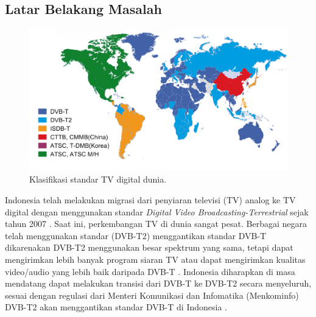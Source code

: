  \chapter{\babSatu}
\section{Latar Belakang Masalah}
\begin{figure}[b!]
	\centering
	\includegraphics[width=1\textwidth]
		{pics/standar.png}
		\caption{Klasifikasi standar TV digital dunia.}
	\label{fig:Klasifikasi Standar TV Digital Dunia}
\end{figure}
Indonesia telah melakukan migrasi dari penyiaran televisi (TV) analog ke TV digital dengan menggunakan standar \textit{Digital Video Broadcasting-Terrestrial}  sejak tahun 2007 \cite{regul2}. Saat ini, perkembangan TV  di dunia sangat pesat. Berbagai negara telah menggunakan standar  (DVB-T2) menggantikan standar DVB-T dikarenakan DVB-T2 menggunakan besar spektrum yang sama, tetapi dapat mengirimkan lebih banyak program siaran TV atau dapat mengirimkan kualitas video/audio yang lebih baik daripada DVB-T \cite{itu}. Indonesia diharapkan di masa mendatang dapat melakukan transisi dari DVB-T ke DVB-T2 secara menyeluruh, sesuai dengan regulasi dari Menteri Komunikasi dan Infomatika (Menkominfo) DVB-T2 akan menggantikan standar DVB-T di Indonesia \cite{regul}.

